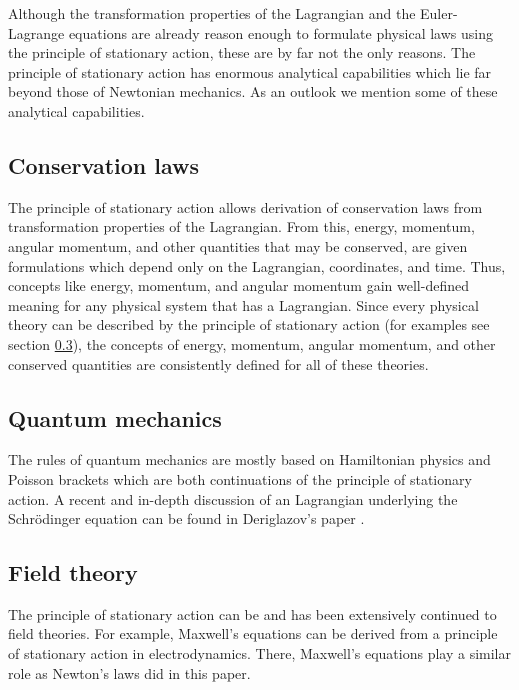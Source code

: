 \documentclass[prb,preprint]{revtex4-1}
\begin{document}
Although the transformation properties of the Lagrangian and the Euler-Lagrange equations are already reason enough to formulate physical laws using the principle of stationary action, these are by far not the only reasons. The principle of stationary action has enormous analytical capabilities which lie far beyond those of Newtonian mechanics. As an outlook we mention some of these analytical capabilities.

\subsection{Conservation laws \cite{KleinertConservation}}
The principle of stationary action allows derivation of conservation laws from transformation properties of the Lagrangian. From this, energy, momentum, angular momentum, and other quantities that may be conserved, are given formulations which depend only on the Lagrangian, coordinates, and time. Thus, concepts like energy, momentum, and angular momentum gain well-defined meaning for any physical system that has a Lagrangian. Since every physical theory can be described by the principle of stationary action (for examples see section \ref{field.theory}), the concepts of energy, momentum, angular momentum, and other conserved quantities are consistently defined for all of these theories.

\subsection{Quantum mechanics \cite{Schwabl}}
The rules of quantum mechanics are mostly based on Hamiltonian physics and Poisson brackets which are both continuations of the principle of stationary action. A recent and in-depth discussion of an Lagrangian underlying the Schr{\"o}dinger equation can be found in Deriglazov's paper \cite{Deriglazov}.


\subsection{Field theory \cite{Sterman,Dirac}} \label{field.theory}
The principle of stationary action can be and has been extensively continued to field theories. For example, Maxwell's equations can be derived from a principle of stationary action in electrodynamics. There, Maxwell's equations play a similar role as Newton's laws did in this paper.
\end{document}
